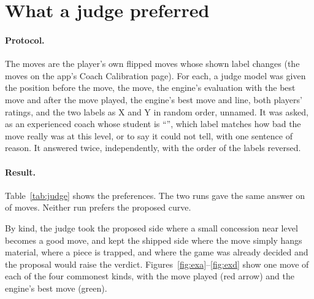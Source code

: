 \documentclass[11pt]{article}
\begin{document}
\section{What a judge preferred}

\paragraph{Protocol.} The \JudgeMoves{} moves are the player's own flipped moves whose shown
label changes (the moves on the app's Coach Calibration page). For each, a judge model was
given the position before the move, the move, the engine's evaluation with the best move and
after the move played, the engine's best move and line, both players' ratings, and the two
labels as X and Y in random order, unnamed. It was asked, as an experienced coach whose student
is ``\JudgeStudent'', which label matches how bad the move really was at this level, or to say it could not tell, with one sentence of reason. It answered twice,
independently, with the order of the labels reversed.

\paragraph{Result.} Table~\ref{tab:judge} shows the preferences. The two runs gave the same
answer on \RunsAgree{} of \JudgeMoves{} moves. Neither run prefers the proposed curve.

\begin{table}[!htbp]
\centering\small
\begin{subtable}{\textwidth}\centering
\JudgeTable
\caption{Each run.}
\end{subtable}

\vspace{0.8em}
\begin{subtable}{\textwidth}\centering
\KindTable
\caption{By the kind of change, as the player sees the labels.}
\end{subtable}
\caption{Which verdict the judge preferred.}
\label{tab:judge}
\end{table}

By kind, the judge took the proposed side where a small concession near level becomes a
good move, and kept the shipped side where the move simply hangs material, where a piece is
trapped, and where the game was already decided and the proposal would raise the verdict.
Figures~\ref{fig:exa}--\ref{fig:exd} show one move of each of the four commonest kinds, with
the move played (red arrow) and the engine's best move (green).
\end{document}
